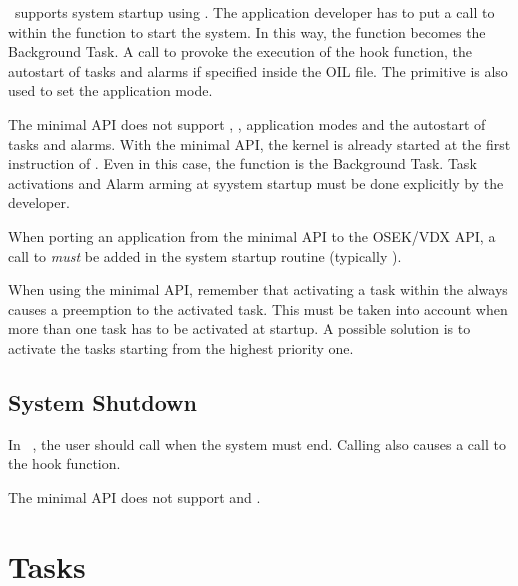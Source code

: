 \documentclass[12pt,a4paper,normalheadings,titlepage]{scrreprt}
\begin{document}
\ee\ supports system startup using . The application 
developer has to put a call to  within the  
function to start the system. In this way, the  function 
becomes the Background Task. A call to  provoke the 
execution of the  hook function, the autostart of tasks 
and alarms if specified inside the OIL file. The  primitive 
is also used to set the application mode. 

The minimal API does not support , , application modes 
and the autostart of tasks and alarms. With the minimal API, the kernel is already 
started at the first instruction of . Even in this case, the 
 function is the Background Task. Task activations and Alarm 
arming at syystem startup must be done explicitly by the developer. 

\begin{warning}
When porting an application from the minimal API to the OSEK/VDX API, a call to 
{\em must} be added in the system startup routine (typically ).
\end{warning}

\begin{warning}
When using the minimal API, remember that activating a task within the  
always causes a preemption to the activated task. This must be taken 
into account when more than one task has to be activated at startup. A 
possible solution is to activate the tasks starting from the 
highest priority one. 
\end{warning}



\subsection{System Shutdown}

In \ee\ , the user should call  when the system must
end. Calling  also causes a call to the
 hook function.

The minimal API does not support  and .



\section{Tasks}
\end{document}
